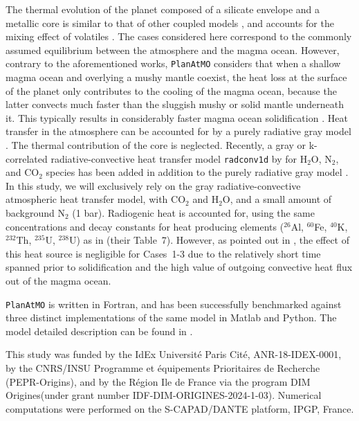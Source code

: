 \documentclass[referee]{aa}
\begin{document}
The thermal evolution of the planet composed of a silicate envelope and a metallic core is similar to that of other coupled models  \citep{lebrun2013thermal,salvador2017relative,nikolaou2019factors}, and  accounts for the mixing effect of volatiles \citep{bower2019linking}. 
The cases considered here correspond to the commonly assumed equilibrium between the atmosphere and the magma ocean. 
However, contrary to the aforementioned works, {\tt PlanAtMO} considers that when a shallow magma ocean and overlying a mushy mantle coexist, 
the heat loss at the surface of the planet only contributes to the cooling of the
magma ocean, because the latter convects much faster than the sluggish mushy or solid mantle underneath it. 
This typically results in considerably faster  magma ocean solidification \citep{Walbecq.etal2025}. 
Heat transfer in the atmosphere can be accounted for by a purely radiative gray model \cite{elkins2008linked}. The thermal contribution of the core is neglected.
Recently, a gray or k-correlated radiative-convective heat transfer model {\tt radconv1d} by \citet{Marcq.etal2017} for H$_2$O, N$_2$, and CO$_2$ species has been added in addition to the purely radiative gray model \cite{elkins2008linked}.
In this study, we will exclusively rely on the gray  radiative-convective atmospheric heat transfer model, with CO$_2$ and H$_2$O, and a small amount of background N$_2$ (1 bar).
Radiogenic heat is accounted for, using the same concentrations and decay constants for heat producing elements ($^{26}$Al, $^{60}$Fe, $^{40}$K, $^{232}$Th, $^{235}$U, $^{238}$U) as in \citet{nikolaou2019factors} (their Table~7). However, as pointed out in \citet{nikolaou2019factors},
the effect of this heat source is negligible for Cases~1-3 due to the relatively short time spanned prior to solidification and the high value of outgoing convective heat flux out of the magma ocean.

{\tt PlanAtMO} is written in Fortran, and has been successfully benchmarked against three distinct implementations of the same model in  Matlab 
and Python. 
The model detailed description can be found in \citet{Walbecq.etal2025}.

\vspace{1cm}

\begin{acknowledgements}
      This study was funded by the IdEx Université Paris Cité, ANR-18-IDEX-0001, by the CNRS/INSU Programme et 
équipements Prioritaires de Recherche (PEPR-Origins), and by the Région Ile de France via the program  DIM Origines(under grant number IDF-DIM-ORIGINES-2024-1-03).
Numerical computations were performed on the S-CAPAD/DANTE platform, IPGP, France. 
\end{acknowledgements}
\end{document}
